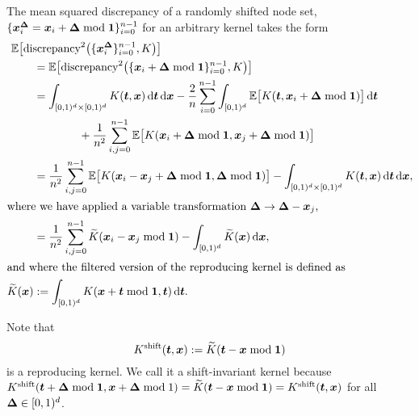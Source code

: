 \documentclass{svproc}
\begin{document}
The mean squared discrepancy of a randomly shifted node set, $\{{\boldsymbol{x}}_i^{{\boldsymbol{\Delta}}} =  {\boldsymbol{x}}_i + {\boldsymbol{\Delta}} \bmod {\boldsymbol{1}} \}_{i=0}^{n-1}$ for an arbitrary kernel takes the form
\begin{align}
\nonumber
\MoveEqLeft \mathbb{E}\bigl[\text{discrepancy}^2 \bigl (\{ \bsx^{\bsDelta}_{i} \}_{i=0}^{n-1},K \bigr) \bigr] \\
\nonumber
& = \mathbb{E}\bigl[\text{discrepancy}^2 \bigl (\{ \bsx_{i} + \bsDelta \bmod \bsone \}_{i=0}^{n-1},K \bigr) \bigr] \\
\nonumber
& = \int_{[0,1)^d \times [0,1)^d} K(\bst,\bsx) \, \mathrm{d} \bst \, \mathrm{d} \bsx  -\frac 2n  \sum_{i=0}^{n-1}  \int_{[0,1)^d} \mathbb{E} \bigl [K(\bst,\bsx_i + \bsDelta \bmod \bsone) \bigr]  \, \mathrm{d} \bst \\
\nonumber
	& \qquad \qquad + \frac{1}{n^2} \sum_{i,j=0}^{n-1}  \mathbb{E} \bigl [ K(\bsx_i + \bsDelta \bmod \bsone,\bsx_j + \bsDelta \bmod \bsone) \bigr] \\
\nonumber
    & = \frac{1}{n^2} \sum_{i,j=0}^{n-1}  \mathbb{E} \bigl [ K(\bsx_i - \bsx_j  + \bsDelta \bmod \bsone, \bsDelta \bmod \bsone) \bigr] - \int_{[0,1)^d \times [0,1)^d} K(\bst,\bsx) \, \mathrm{d} \bst \, \mathrm{d} \bsx ,\\
    \intertext{where we have applied a variable transformation $\bsDelta \to \bsDelta - \bsx_j$,}
    & = \frac{1}{n^2} \sum_{i,j=0}^{n-1}  \widetilde{K}(\bsx_i - \bsx_j \bmod \bsone ) - \int_{[0,1)^d} \widetilde{K}(\bsx) \, \mathrm{d} \bsx, \\
    \intertext{and where the filtered version of the reproducing kernel is defined as}
    \widetilde{K}(\bsx) &: = \int_{[0,1)^d} K(\bsx + \bst \bmod \bsone, \bst) \, \mathrm{d} \bst.
\end{align}

Note that 
\begin{equation} \label{eq:shinvK}
    K^{\text{shift}} ({\boldsymbol{t}}, {\boldsymbol{x}}) := \widetilde{K}({\boldsymbol{t}} - {\boldsymbol{x}} \bmod {\boldsymbol{1}})
\end{equation}
is a reproducing kernel.  We call it a shift-invariant kernel because $K^{\text{shift}} ({\boldsymbol{t}} + {\boldsymbol{\Delta}} \bmod {\boldsymbol{1}}, {\boldsymbol{x}} + {\boldsymbol{\Delta}} \bmod1) = \widetilde{K}({\boldsymbol{t}} - {\boldsymbol{x}} \bmod {\boldsymbol{1}}) =  K^{\text{shift}} ({\boldsymbol{t}}, {\boldsymbol{x}}) $ for all ${\boldsymbol{\Delta}} \in [0,1)^d$.
\end{document}

